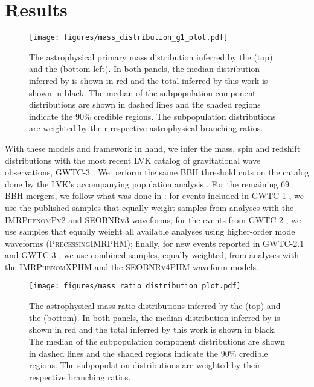 \section{Results} \label{sec:results}

\begin{figure*}[ht!]
    \begin{centering}
        \texttt{[image: figures/mass\_distribution\_g1\_plot.pdf]}
        \caption{The astrophysical primary mass distribution inferred by the \base{} (top) and the \comp{} (bottom left). In both panels, the median distribution inferred by \brucepaper is shown in red and the total inferred by this work is shown in black. The median of the subpopulation component distributions are shown in dashed lines and the shaded regions indicate the $90\%$ credible regions. The subpopulation distributions are weighted by their respective astrophysical branching ratios.}
        \label{fig:g1_mass_distribution}
    \end{centering}
\end{figure*}

With these models and framework in hand, we infer the mass, spin and redshift distributions with the most recent LVK catalog of gravitational wave observations, GWTC-3 \citep{2021arXiv211103606T}. We perform the same BBH threshold cuts on the catalog done by the LVK's accompanying population analysis \othreea{}. For the remaining 69 BBH mergers, we follow what was done in \citet{2021arXiv211103606T}: for events included in GWTC-1 \citep{2019ApJ...882L..24A}, we use the published samples that equally weight samples from analyses with the \textsc{IMRPhenomPv2} \citep{1308.3271} and \textsc{SEOBNRv3} \citep{1307.6232,1311.2544} waveforms; for the events from GWTC-2 \citep{2021ApJ...913L...7A}, we use samples that equally weight all available analyses using higher-order mode waveforms (\textsc{PrecessingIMRPHM}); finally, for new events reported in GWTC-2.1 and GWTC-3 \citep{2021arXiv211103606T,2108.01045}, we use combined samples, equally weighted, from analyses with the \textsc{IMRPhenomXPHM} \citep{2004.06503} and the \textsc{SEOBNRv4PHM} \citep{2004.09442} waveform models.


\begin{figure}[ht!]
    \begin{centering}
        \texttt{[image: figures/mass\_ratio\_distribution\_plot.pdf]}
        \caption{The astrophysical mass ratio distributions inferred by the \base{} (top) and the \comp{} (bottom). In both panels, the median distribution inferred by \brucepaper is shown in red and the total inferred by this work is shown in black. The median of the subpopulation component distributions are shown in dashed lines and the shaded regions indicate the $90\%$ credible regions. The subpopulation distributions are weighted by their respective branching ratios.}
        \label{fig:mass_ratio_distribution}
    \end{centering}
\end{figure}

